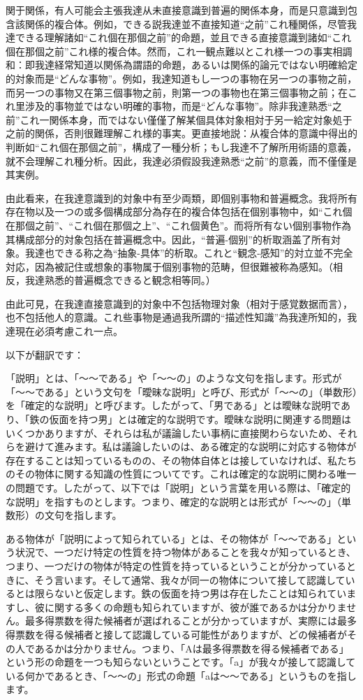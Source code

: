 \documentclass[a4paper,11pt,openany]{ltjsbook}
\begin{document}
関于関係，有人可能会主張我達从未直接意識到普遍的関係本身，而是只意識到包含該関係的複合体。例如，できる説我達並不直接知道“之前”これ種関係，尽管我達できる理解諸如“これ個在那個之前”的命題，並且できる直接意識到諸如“これ個在那個之前”これ様的複合体。然而，これ一観点難以とこれ様一つの事実相調和：即我達経常知道以関係為謂語的命題，あるいは関係的論元ではない明確給定的対象而是“どんな事物”。例如，我達知道もし一つの事物在另一つの事物之前，而另一つの事物又在第三個事物之前，則第一つの事物也在第三個事物之前；在これ里涉及的事物並ではない明確的事物，而是“どんな事物”。除非我達熟悉“之前”これ一関係本身，而ではない僅僅了解某個具体対象相対于另一給定対象処于之前的関係，否則很難理解これ様的事実。更直接地説：从複合体的意識中得出的判断如“これ個在那個之前”，構成了一種分析；もし我達不了解所用術語的意義，就不会理解これ種分析。因此，我達必須假設我達熟悉“之前”的意義，而不僅僅是其実例。

由此看来，在我達意識到的対象中有至少両類，即個别事物和普遍概念。我将所有存在物以及一つの或多個構成部分為存在的複合体包括在個别事物中，如“これ個在那個之前”、“これ個在那個之上”、“これ個黄色”。而将所有ない個别事物作為其構成部分的対象包括在普遍概念中。因此，“普遍-個别”的析取涵盖了所有対象。我達也できる称之為“抽象-具体”的析取。これと“観念-感知”的対立並不完全対応，因為被記住或想象的事物属于個别事物的范畴，但很難被称為感知。（相反，我達熟悉的普遍概念できると観念相等同。）

由此可見，在我達直接意識到的対象中不包括物理対象（相対于感覚数据而言），也不包括他人的意識。これ些事物是通過我所謂的“描述性知識”為我達所知的，我達現在必須考慮これ一点。

以下が翻訳です：

「説明」とは、「～～である」や「～～の」のような文句を指します。形式が「～～である」という文句を「曖昧な説明」と呼び、形式が「～～の」（単数形）を「確定的な説明」と呼びます。したがって、「男である」とは曖昧な説明であり、「鉄の仮面を持つ男」とは確定的な説明です。曖昧な説明に関連する問題はいくつかありますが、それらは私が議論したい事柄に直接関わらないため、それらを避けて進みます。私は議論したいのは、ある確定的な説明に対応する物体が存在することは知っているものの、その物体自体とは接していなければ、私たちのその物体に関する知識の性質についてです。これは確定的な説明に関わる唯一の問題です。したがって、以下では「説明」という言葉を用いる際は、「確定的な説明」を指すものとします。つまり、確定的な説明とは形式が「～～の」（単数形）の文句を指します。

ある物体が「説明によって知られている」とは、その物体が「～～である」という状況で、一つだけ特定の性質を持つ物体があることを我々が知っているとき、つまり、一つだけの物体が特定の性質を持っているということが分かっているときに、そう言います。そして通常、我々が同一の物体について接して認識しているとは限らないと仮定します。鉄の仮面を持つ男は存在したことは知られていますし、彼に関する多くの命題も知られていますが、彼が誰であるかは分かりません。最多得票数を得た候補者が選ばれることが分かっていますが、実際には最多得票数を得る候補者と接して認識している可能性がありますが、どの候補者がその人であるかは分かりません。つまり、「Aは最多得票数を得る候補者である」という形の命題を一つも知らないということです。「a」が我々が接して認識している何かであるとき、「～～の」形式の命題「aは～～である」というものを指します。
\end{document}
